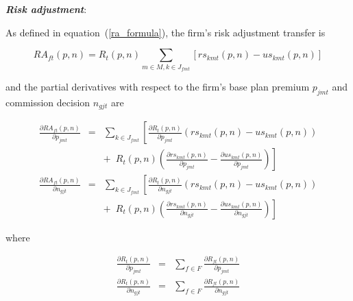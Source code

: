 \documentclass[12pt]{article}
\begin{document}
		\doublespacing
						
	
	
\noindent \textit{\bf Risk adjustment}:
	
\noindent As defined in equation~(\ref{ra_formula}), the firm's risk adjustment transfer is	
	
	\vspace{-0.3in}		
		
	$$
	RA_{ft}(\textit{p},\textit{n}) =  R_t(\textit{p},\textit{n}) \sum_{m \in M, k \in J_{fmt}} \left[ rs_{kmt}(\textit{p},\textit{n}) - us_{kmt}(\textit{p},\textit{n})  \right]
	$$		
			
\noindent and the partial derivatives with respect to the firm's base plan premium $p_{jmt}$ and commission decision $n_{gjt}$ are 			
		
		\vspace{-0.4in}		
	
		\begin{eqnarray*}
		\frac{\partial RA_{ft}(\textit{p},\textit{n})}{\partial p_{jmt}} &=& \sum_{k \in J_{fmt}}  \left[\frac{\partial R_t(\textit{p},\textit{n})}{\partial p_{jmt}}\left( rs_{kmt}(\textit{p},\textit{n}) - us_{kmt}(\textit{p},\textit{n})  \right) \right. \nonumber \\ && \left. + \,\,\,  R_t(\textit{p},\textit{n}) \left( \frac{\partial rs_{kmt}(\textit{p},\textit{n})}{\partial p_{jmt}} - \frac{\partial  us_{kmt}(\textit{p},\textit{n})}{\partial p_{jmt}} \right) \right] \\
		\frac{\partial RA_{ft}(\textit{p},\textit{n})}{\partial n_{gjt}} &=& \sum_{k \in J_{fmt}}  \left[\frac{\partial R_t(\textit{p},\textit{n})}{\partial n_{gjt}}\left( rs_{kmt}(\textit{p},\textit{n}) - us_{kmt}(\textit{p},\textit{n})  \right) \right. \nonumber \\ && \left. + \,\,\,  R_t(\textit{p},\textit{n}) \left( \frac{\partial rs_{kmt}(\textit{p},\textit{n})}{\partial n_{gjt}} - \frac{\partial  us_{kmt}(\textit{p},\textit{n})}{\partial n_{gjt}} \right) \right]
		\end{eqnarray*}

		\vspace{-0.1in}			
			
\noindent where			
	
\vspace{-0.4in}	

	


	\begin{eqnarray*}
	\frac{\partial R_t(\textit{p},\textit{n})}{\partial p_{jmt}} &=& \sum_{f \in F} \frac{\partial R_{ft}(\textit{p},\textit{n})}{\partial p_{jmt}} \\
	\frac{\partial R_t(\textit{p},\textit{n})}{\partial n_{gjt}} &=& \sum_{f \in F} \frac{\partial R_{ft}(\textit{p},\textit{n})}{\partial n_{gjt}}
	\end{eqnarray*}
\end{document}
